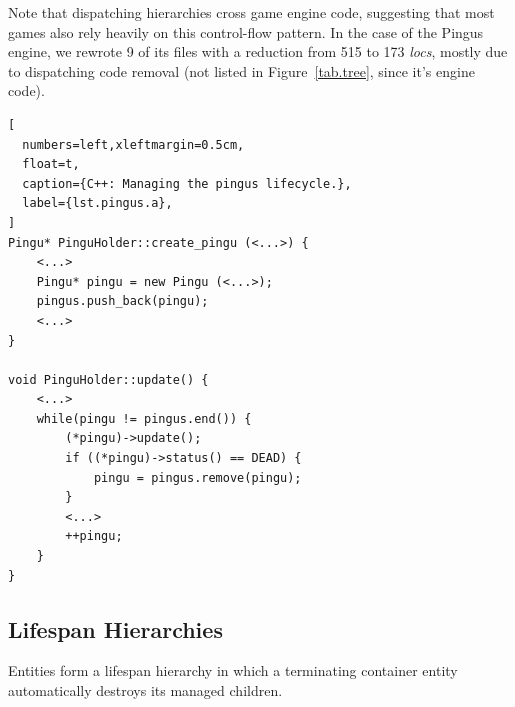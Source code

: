 \documentclass[10pt, conference, compsocconf]{IEEEtran}
\newcommand{\locs}{\emph{locs}\xspace}
\begin{document}
Note that dispatching hierarchies cross game engine code, suggesting that most
games also rely heavily on this control-flow pattern.
In the case of the Pingus engine, we rewrote 9 of its files with a reduction
from 515 to 173 \locs, mostly due to dispatching code removal (not listed in
Figure~\ref{tab.tree}, since it's engine code).

\begin{lstlisting}[
  numbers=left,xleftmargin=0.5cm,
  float=t,
  caption={C++: Managing the pingus lifecycle.},
  label={lst.pingus.a},
]
Pingu* PinguHolder::create_pingu (<...>) {
    <...>
    Pingu* pingu = new Pingu (<...>);
    pingus.push_back(pingu);
    <...>
}

void PinguHolder::update() {
    <...>
    while(pingu != pingus.end()) {
        (*pingu)->update();
        if ((*pingu)->status() == DEAD) {
            pingu = pingus.remove(pingu);
        }
        <...>
        ++pingu;
    }
}
\end{lstlisting}

\subsection{Lifespan Hierarchies}
\label{sec.pats.lifespan}

    Entities form a lifespan hierarchy in which a terminating container entity
    automatically destroys its managed children.
\end{document}
